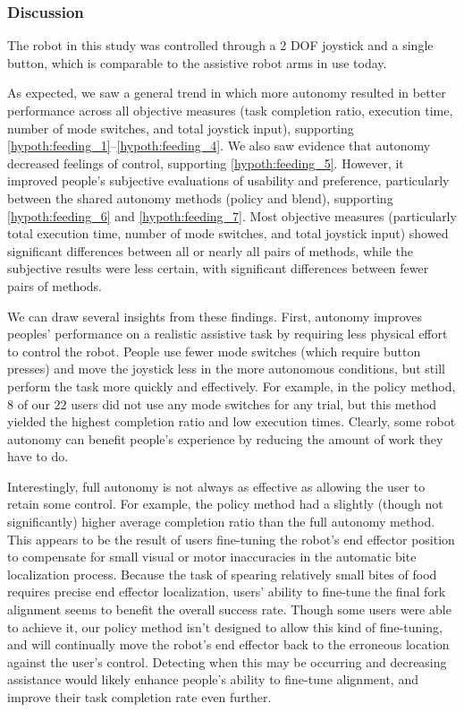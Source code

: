 \subsubsection{Discussion}
The robot in this study was controlled through a 2 DOF joystick and a single button, which is comparable to the assistive robot arms in use today.

As expected, we saw a general trend in which more autonomy resulted in better performance across all objective measures (task completion ratio, execution time, number of mode switches, and total joystick input), supporting \cref{hypoth:feeding_1}--\cref{hypoth:feeding_4}. We also saw evidence that autonomy decreased feelings of control, supporting \cref{hypoth:feeding_5}. However, it improved people's subjective evaluations of usability and preference, particularly between the shared autonomy methods (policy and blend), supporting \cref{hypoth:feeding_6} and \cref{hypoth:feeding_7}. Most objective measures (particularly total execution time, number of mode switches, and total joystick input) showed significant differences between all or nearly all pairs of methods, while the subjective results were less certain, with significant differences between fewer pairs of methods.

We can draw several insights from these findings. First, autonomy improves peoples' performance on a realistic assistive task by requiring less physical effort to control the robot. People use fewer mode switches (which require button presses) and move the joystick less in the more autonomous conditions, but still perform the task more quickly and effectively. For example, in the policy method, $8$ of our $22$ users did not use any mode switches for any trial, but this method yielded the highest completion ratio and low execution times. Clearly, some robot autonomy can benefit people's experience by reducing the amount of work they have to do.

Interestingly, full autonomy is not always as effective as allowing the user to retain some control. For example, the policy method had a slightly (though not significantly) higher average completion ratio than the full autonomy method. This appears to be the result of users fine-tuning the robot's end effector position to compensate for small visual or motor inaccuracies in the automatic bite localization process. Because the task of spearing relatively small bites of food requires precise end effector localization, users' ability to fine-tune the final fork alignment seems to benefit the overall success rate. Though some users were able to achieve it, our policy method isn't designed to allow this kind of fine-tuning, and will continually move the robot's end effector back to the erroneous location against the user's control. Detecting when this may be occurring and decreasing assistance would likely enhance people's ability to fine-tune alignment, and improve their task completion rate even further.


